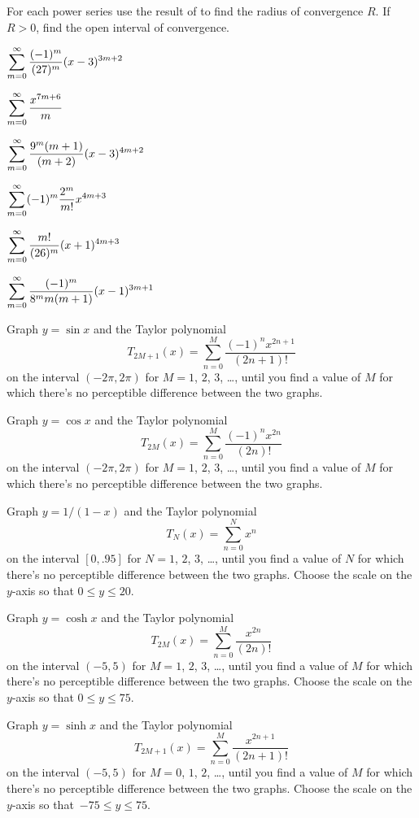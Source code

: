 \begin{exerciselist}
\item\label{exer:7.1.5}For each power series use the result of  to find
the radius of convergence $R$. If $R>0$, find the open interval of
convergence.
\begin{alist*}[columns=2]
\item $\displaystyle{\sum_{m=0}^\infty\frac{(-1)^m}{(27)^m}(x-3)^{3m+2}}$
\item $\displaystyle{\sum_{m=0}^\infty\frac{x^{7m+6}}{m}}$
\item $\displaystyle{\sum_{m=0}^\infty\frac{9^m(m+1)}{(m+2)}(x-3)^{4m+2}}$
\item $\displaystyle{\sum_{m=0}^\infty(-1)^m\frac{2^m}{m!}x^{4m+3}}$
\item $\displaystyle{\sum_{m=0}^\infty\frac{m!}{(26)^m}(x+1)^{4m+3}}$
\item $\displaystyle{\sum_{m=0}^\infty\frac{(-1)^m}{8^mm(m+1)}(x-1)^{3m+1}}$
\end{alist*}

\item\label{exer:7.1.6}\Lex
Graph $y=\sin x$ and the Taylor polynomial
\[
T_{2M+1}(x)=\sum_{n=0}^M\frac{(-1)^nx^{2n+1}}{(2n+1)!}
\]
on the interval $(-2\pi,2\pi)$ for $M=1$, $2$, $3$, \dots, until you find
a value of $M$ for which there's no perceptible difference between the
two graphs.


\item\label{exer:7.1.7}\Lex
Graph $y=\cos x$ and the Taylor polynomial
\[
T_{2M}(x)=\sum_{n=0}^M\frac{(-1)^nx^{2n}}{(2n)!}
\]
on the interval $(-2\pi,2\pi)$ for $M=1$, $2$, $3$, \dots, until you find a
value of $M$ for which there's no perceptible difference between the
two graphs.

\item\label{exer:7.1.8}\Lex
Graph $y=1/(1-x)$ and the Taylor polynomial
\[
T_N(x)=\sum_{n=0}^Nx^n
\]
on the interval $[0,.95]$ for $N=1$, $2$, $3$, \dots, until you find a
value of $N$ for which there's no perceptible difference between the
two graphs. Choose the scale on the $y$-axis so that $0\le y\le20$.

\item\label{exer:7.1.9}\Lex
Graph $y=\cosh x$ and the Taylor polynomial
\[
T_{2M}(x)=\sum_{n=0}^M\frac{x^{2n}}{(2n)!}
\]
on the interval $(-5,5)$ for $M=1$, $2$, $3$, \dots, until you find a
value of $M$ for which there's no perceptible difference between the
two graphs.
 Choose the scale on the $y$-axis so that $0\le y\le75$.

\item\label{exer:7.1.10}\Lex
Graph $y=\sinh x$ and the Taylor polynomial
\[
T_{2M+1}(x)=\sum_{n=0}^M\frac{x^{2n+1}}{(2n+1)!}
\]
on the interval $(-5,5)$ for $M=0$, $1$, $2$, \dots, until you find a
value of $M$ for which there's no perceptible difference between the
two graphs.
 Choose the scale on the $y$-axis so that~$-75\le y\le75$.
\end{exerciselist}
